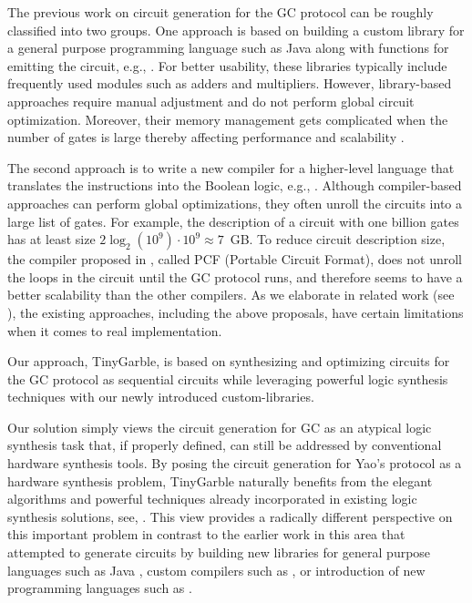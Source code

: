 The previous work on circuit generation for the GC protocol can be roughly classified into two groups.
One approach is based on building a custom library for a general purpose programming language such as Java along with functions for emitting the circuit, e.g., \cite{huang2011faster,malka2011vmcrypt,henecka2013faster}.
For better usability, these libraries typically include frequently used modules such as adders and multipliers.
However, library-based approaches require manual adjustment and do not perform global circuit optimization.
Moreover, their memory management gets complicated when the number of gates is large thereby affecting performance and scalability \cite{henecka2013faster}.

The second approach is to write a new compiler for a higher-level language that translates the instructions into the Boolean logic, e.g., \cite{malkhi2004fairplay,kreuter2012billion,kreuter2013pcf,franz2014cbmc}.
Although compiler-based approaches can perform global optimizations, they often unroll the circuits into a large list of gates.
For example, the description of a circuit with one billion gates has at least size $2 \log_2 (10^9) \cdot 10^{9} \approx 7$~GB.
To reduce circuit description size, the compiler proposed in \cite{kreuter2013pcf}, called PCF (Portable Circuit Format), does not unroll the loops in the circuit until the GC protocol runs, and therefore seems to have a better scalability than the other compilers.
As we elaborate in related work (see ), the existing approaches, including the above proposals, have certain limitations when it comes to real implementation.

Our approach, TinyGarble, is based on synthesizing and optimizing circuits for the GC protocol as sequential circuits while leveraging powerful logic synthesis techniques with our newly introduced custom-libraries.

Our solution simply views the circuit generation for GC as an atypical logic synthesis task that, if properly defined, can still be addressed by conventional hardware synthesis tools.
By posing the circuit generation for Yao's protocol as a hardware synthesis problem, TinyGarble naturally benefits from the elegant algorithms and powerful techniques already incorporated in existing logic synthesis solutions, see, \cite{sentovich1992sis,micheli1994synthesis,devadas1994logic,brayton1987mis}.
This view provides a radically different perspective on this important problem in contrast to the earlier work in this area that attempted to generate circuits by building new libraries for general purpose languages such as Java \cite{huang2011faster,malka2011vmcrypt}, custom compilers such as \cite{kreuter2013pcf,franz2014cbmc}, or introduction of new programming languages such as \cite{malkhi2004fairplay,rastogi2014wysteria}.

